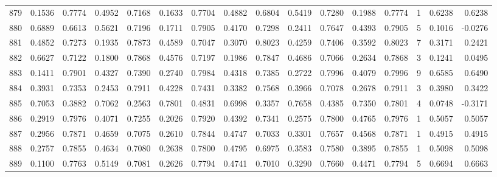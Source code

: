 \begin{tabular}{lrrrrrrrrrrrrrrr}
879 &      0.1536 &  0.7774 &  0.4952 &  0.7168 &  0.1633 &  0.7704 &  0.4882 &  0.6804 &  0.5419 &  0.7280 &   0.1988 &     0.7774 &      1 &                    0.6238 &                     0.6238 \\
880 &      0.6889 &  0.6613 &  0.5621 &  0.7196 &  0.1711 &  0.7905 &  0.4170 &  0.7298 &  0.2411 &  0.7647 &   0.4393 &     0.7905 &      5 &                    0.1016 &                    -0.0276 \\
881 &      0.4852 &  0.7273 &  0.1935 &  0.7873 &  0.4589 &  0.7047 &  0.3070 &  0.8023 &  0.4259 &  0.7406 &   0.3592 &     0.8023 &      7 &                    0.3171 &                     0.2421 \\
882 &      0.6627 &  0.7122 &  0.1800 &  0.7868 &  0.4576 &  0.7197 &  0.1986 &  0.7847 &  0.4686 &  0.7066 &   0.2634 &     0.7868 &      3 &                    0.1241 &                     0.0495 \\
883 &      0.1411 &  0.7901 &  0.4327 &  0.7390 &  0.2740 &  0.7984 &  0.4318 &  0.7385 &  0.2722 &  0.7996 &   0.4079 &     0.7996 &      9 &                    0.6585 &                     0.6490 \\
884 &      0.3931 &  0.7353 &  0.2453 &  0.7911 &  0.4228 &  0.7431 &  0.3382 &  0.7568 &  0.3966 &  0.7078 &   0.2678 &     0.7911 &      3 &                    0.3980 &                     0.3422 \\
885 &      0.7053 &  0.3882 &  0.7062 &  0.2563 &  0.7801 &  0.4831 &  0.6998 &  0.3357 &  0.7658 &  0.4385 &   0.7350 &     0.7801 &      4 &                    0.0748 &                    -0.3171 \\
886 &      0.2919 &  0.7976 &  0.4071 &  0.7255 &  0.2026 &  0.7920 &  0.4392 &  0.7341 &  0.2575 &  0.7800 &   0.4765 &     0.7976 &      1 &                    0.5057 &                     0.5057 \\
887 &      0.2956 &  0.7871 &  0.4659 &  0.7075 &  0.2610 &  0.7844 &  0.4747 &  0.7033 &  0.3301 &  0.7657 &   0.4568 &     0.7871 &      1 &                    0.4915 &                     0.4915 \\
888 &      0.2757 &  0.7855 &  0.4634 &  0.7080 &  0.2638 &  0.7800 &  0.4795 &  0.6975 &  0.3583 &  0.7580 &   0.3895 &     0.7855 &      1 &                    0.5098 &                     0.5098 \\
889 &      0.1100 &  0.7763 &  0.5149 &  0.7081 &  0.2626 &  0.7794 &  0.4741 &  0.7010 &  0.3290 &  0.7660 &   0.4471 &     0.7794 &      5 &                    0.6694 &                     0.6663 \\

\end{tabular}
